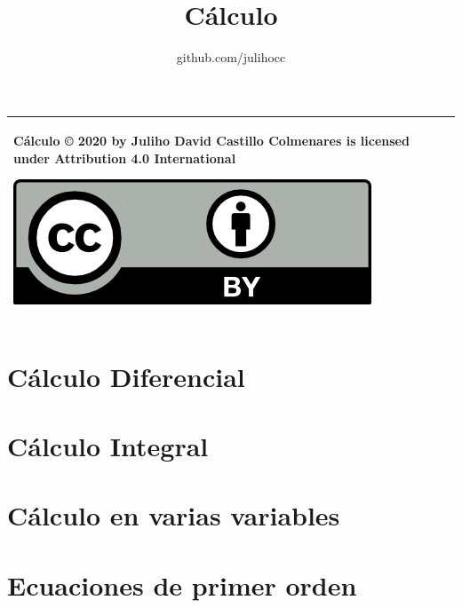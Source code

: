 \documentclass{tufte-book}
\title{Cálculo}
\author{github.com/julihocc}
\begin{document}
	\maketitle
\begin{tabular}{|p{}|}
	\hline
Cálculo © 2020 by Juliho David Castillo Colmenares is licensed under Attribution 4.0 International
	\begin{center}
		\includegraphics[scale=1]{./licencia/by.png}
	\end{center}\\
	\hline
\end{tabular}
\tableofcontents

\chapter{Cálculo Diferencial}








\chapter{Cálculo Integral}









\chapter{Cálculo en varias variables}



\chapter{Ecuaciones de primer orden}




\end{document}
